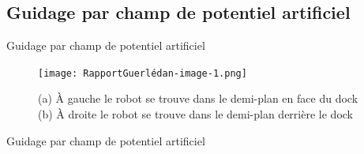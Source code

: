 \documentclass[pdftex,beamer,aspectratio=169]{beamer}
\theoremstyle{definition}
\theoremstyle{example}
\theoremstyle{plain}
\begin{document}
\subsection{Guidage par champ de potentiel artificiel}
\begin{frame}[fragile]{Guidage par champ de potentiel artificiel}
  \begin{figure}
  \centering
  \texttt{[image: RapportGuerlédan-image-1.png]}
  \caption{(a) À gauche le robot se trouve dans le demi-plan en face du dock (b) À droite le robot se trouve dans le demi-plan derrière le dock}
\end{figure}

\end{frame}

\begin{frame}[fragile]{Guidage par champ de potentiel artificiel}


\end{frame}
\end{document}
